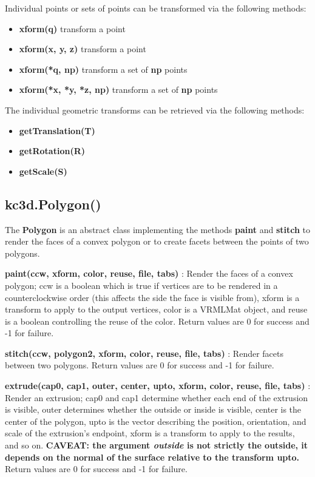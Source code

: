 Individual points or sets of points can be transformed via the following methods:

\begin{itemize}
\item \textbf{xform(q)} transform a point\\
\item \textbf{xform(x, y, z)} transform a point\\
\item \textbf{xform(*q, np)} transform a set of \textbf{np} points\\
\item \textbf{xform(*x, *y, *z, np)} transform a set of \textbf{np} points\\
\end{itemize}

The individual geometric transforms can be retrieved via the following methods:

\begin{itemize}
\item \textbf{getTranslation(T)}\\
\item \textbf{getRotation(R)}\\
\item \textbf{getScale(S)}\\
\end{itemize}

\subsection{kc3d.Polygon()}
The \textbf{Polygon} is an abstract class implementing the methods \textbf{paint}
and \textbf{stitch} to render the faces of a convex polygon or to create facets
between the points of two polygons.

\textbf{paint(ccw, xform, color, reuse, file, tabs)} : Render the faces of a convex polygon;
ccw is a boolean which is true if vertices are to be rendered in a counterclockwise order (this
affects the side the face is visible from), xform is a transform to apply to the output vertices,
color is a VRMLMat object, and reuse is a boolean controlling the reuse of the color.
Return values are 0 for success and -1 for failure.

\textbf{stitch(ccw, polygon2, xform, color, reuse, file, tabs)} : Render facets between two
polygons. Return values are 0 for success and -1 for failure.

\textbf{extrude(cap0, cap1, outer, center, upto, xform, color, reuse, file, tabs)} : 
Render an extrusion; cap0 and cap1 determine whether each end of the extrusion is
visible, outer determines whether the outside or inside is visible, center is the
center of the polygon, upto is the vector describing the position, orientation,
and scale of the extrusion's endpoint, xform is a transform to apply to the results,
and so on. \textbf{CAVEAT: the argument \emph{outside} is not strictly the outside,
it depends on the normal of the surface relative to the transform upto.}
Return values are 0 for success and -1 for failure.

